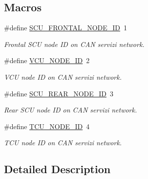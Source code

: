 \subsection*{Macros}
\begin{DoxyCompactItemize}
\item 
\mbox{\label{group___c_a_n___i_d_ga8d64b6b4c0f02ebded5440c6250e03b9}} 
\#define \mbox{\hyperlink{group___c_a_n___i_d_ga8d64b6b4c0f02ebded5440c6250e03b9}{S\+C\+U\+\_\+\+F\+R\+O\+N\+T\+A\+L\+\_\+\+N\+O\+D\+E\+\_\+\+ID}}~1
\begin{DoxyCompactList}\small\item\em Frontal S\+CU node ID on C\+AN servizi network. \end{DoxyCompactList}\item 
\mbox{\label{group___c_a_n___i_d_ga5703fd8de5ab8d0dcedb561f2178829e}} 
\#define \mbox{\hyperlink{group___c_a_n___i_d_ga5703fd8de5ab8d0dcedb561f2178829e}{V\+C\+U\+\_\+\+N\+O\+D\+E\+\_\+\+ID}}~2
\begin{DoxyCompactList}\small\item\em V\+CU node ID on C\+AN servizi network. \end{DoxyCompactList}\item 
\mbox{\label{group___c_a_n___i_d_gab91968b64bc7fa886f6a6147d25d488b}} 
\#define \mbox{\hyperlink{group___c_a_n___i_d_gab91968b64bc7fa886f6a6147d25d488b}{S\+C\+U\+\_\+\+R\+E\+A\+R\+\_\+\+N\+O\+D\+E\+\_\+\+ID}}~3
\begin{DoxyCompactList}\small\item\em Rear S\+CU node ID on C\+AN servizi network. \end{DoxyCompactList}\item 
\mbox{\label{group___c_a_n___i_d_gaceef3f7366b39e88d89cb98ad8094c7b}} 
\#define \mbox{\hyperlink{group___c_a_n___i_d_gaceef3f7366b39e88d89cb98ad8094c7b}{T\+C\+U\+\_\+\+N\+O\+D\+E\+\_\+\+ID}}~4
\begin{DoxyCompactList}\small\item\em T\+CU node ID on C\+AN servizi network. \end{DoxyCompactList}\end{DoxyCompactItemize}


\subsection{Detailed Description}

